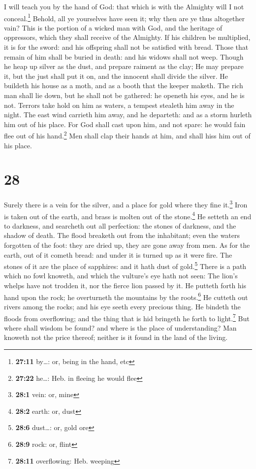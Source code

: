  I will teach you by the hand of God: that which is with
the Almighty will I not conceal.\footnote{\textbf{27:11} by\ldots: or,
  being in the hand, etc}  Behold, all ye yourselves have
seen it; why then are ye thus altogether vain?  This is
the portion of a wicked man with God, and the heritage of oppressors,
which they shall receive of the Almighty.  If his
children be multiplied, it is for the sword: and his offspring shall not
be satisfied with bread.  Those that remain of him shall
be buried in death: and his widows shall not weep. 
Though he heap up silver as the dust, and prepare raiment as the clay;
 He may prepare it, but the just shall put it on, and the
innocent shall divide the silver.  He buildeth his house
as a moth, and as a booth that the keeper maketh.  The
rich man shall lie down, but he shall not be gathered: he openeth his
eyes, and he is not.  Terrors take hold on him as waters,
a tempest stealeth him away in the night.  The east wind
carrieth him away, and he departeth: and as a storm hurleth him out of
his place.  For God shall cast upon him, and not spare:
he would fain flee out of his hand.\footnote{\textbf{27:22} he\ldots:
  Heb. in fleeing he would flee}  Men shall clap their
hands at him, and shall hiss him out of his place.

\hypertarget{section-27}{%
\section{28}\label{section-27}}

 Surely there is a vein for the silver, and a place for
gold where they fine it.\footnote{\textbf{28:1} vein: or, mine}
 Iron is taken out of the earth, and brass is molten out
of the stone.\footnote{\textbf{28:2} earth: or, dust}  He
setteth an end to darkness, and searcheth out all perfection: the stones
of darkness, and the shadow of death.  The flood breaketh
out from the inhabitant; even the waters forgotten of the foot: they are
dried up, they are gone away from men.  As for the earth,
out of it cometh bread: and under it is turned up as it were fire.
 The stones of it are the place of sapphires: and it hath
dust of gold.\footnote{\textbf{28:6} dust\ldots: or, gold ore}
 There is a path which no fowl knoweth, and which the
vulture's eye hath not seen:  The lion's whelps have not
trodden it, nor the fierce lion passed by it.  He putteth
forth his hand upon the rock; he overturneth the mountains by the
roots.\footnote{\textbf{28:9} rock: or, flint}  He
cutteth out rivers among the rocks; and his eye seeth every precious
thing.  He bindeth the floods from overflowing; and the
thing that is hid bringeth he forth to light.\footnote{\textbf{28:11}
  overflowing: Heb. weeping}  But where shall wisdom be
found? and where is the place of understanding?  Man
knoweth not the price thereof; neither is it found in the land of the
living.

